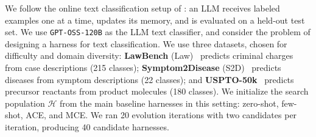 We follow the online text classification setup of \citet{zhang2025ace,ye2026meta}: an LLM receives labeled examples one at a time, updates its memory, and is evaluated on a held-out test set.
We use \texttt{GPT-OSS-120B} as the LLM text classifier, and consider the problem of designing a harness for text classification.
We use three datasets, chosen for difficulty and domain diversity:
\textbf{LawBench} (Law)~\citep{fei2024lawbench} predicts criminal charges from case descriptions (215 classes);
\textbf{Symptom2Disease} (S2D)~\citep{gretelai_symptom_to_diagnosis_2023} predicts diseases from symptom descriptions (22 classes);
and \textbf{USPTO-50k}~\citep{schneider2016s} predicts precursor reactants from product molecules (180 classes).
We initialize the search population $\mathcal{H}$ from the main baseline harnesses in this setting: zero-shot, few-shot, ACE, and MCE.
We ran 20 evolution iterations with two candidates per iteration, producing 40 candidate harnesses.

